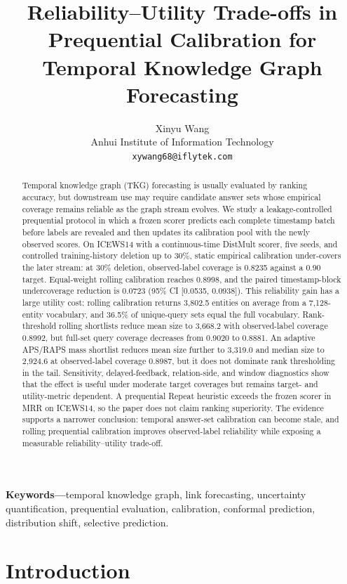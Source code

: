 \documentclass[10pt,twocolumn]{article}
\title{Reliability--Utility Trade-offs in Prequential Calibration for
Temporal Knowledge Graph Forecasting}
\author{Xinyu Wang\\
\small Anhui Institute of Information Technology\\
\small \texttt{xywang68@iflytek.com}}
\begin{document}
\maketitle

\begin{abstract}
Temporal knowledge graph (TKG) forecasting is usually evaluated by ranking
accuracy, but downstream use may require candidate answer sets whose empirical
coverage remains reliable as the graph stream evolves. We study a
leakage-controlled prequential protocol in which a frozen scorer predicts each
complete timestamp batch before labels are revealed and then updates its
calibration pool with the newly observed scores. On ICEWS14 with a
continuous-time DistMult scorer, five seeds, and controlled training-history
deletion up to 30\%, static empirical calibration under-covers the later stream:
at 30\% deletion, observed-label coverage is 0.8235 against a 0.90 target.
Equal-weight rolling calibration reaches 0.8998, and the paired
timestamp-block undercoverage reduction is 0.0723 (95\% CI [0.0535, 0.0938]).
This reliability gain has a large utility cost: rolling calibration returns
3,802.5 entities on average from a 7,128-entity vocabulary, and 36.5\% of
unique-query sets equal the full vocabulary. Rank-threshold rolling shortlists
reduce mean size to 3,668.2 with observed-label coverage 0.8992, but full-set
query coverage decreases from 0.9020 to 0.8881. An adaptive APS/RAPS mass
shortlist reduces mean size further to 3,319.0 and median size to 2,924.6 at
observed-label coverage 0.8987, but it does not dominate rank thresholding in
the tail. Sensitivity, delayed-feedback, relation-side, and window diagnostics
show that the effect is useful under moderate target coverages but remains
target- and utility-metric dependent. A prequential Repeat heuristic exceeds
the frozen scorer in MRR on ICEWS14, so the paper does not claim ranking
superiority. The evidence supports a narrower conclusion: temporal answer-set
calibration can become stale, and rolling prequential calibration improves
observed-label reliability while exposing a measurable reliability--utility
trade-off.
\end{abstract}

\noindent\textbf{Keywords---}temporal knowledge graph, link forecasting,
uncertainty quantification, prequential evaluation, calibration, conformal
prediction, distribution shift, selective prediction.

\section{Introduction}
\label{sec:introduction}
\end{document}
